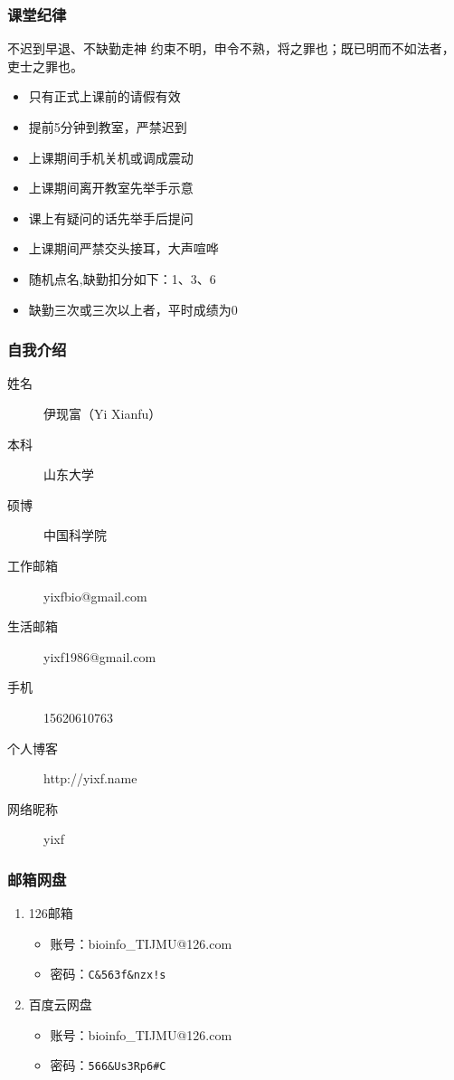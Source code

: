 \begin{frame}
  \frametitle{课堂纪律}
  \begin{alertblock}{不迟到早退、不缺勤走神}
  约束不明，申令不熟，将之罪也；既已明而不如法者，吏士之罪也。
  \end{alertblock}
  \pause
  \begin{itemize}[<+-|alert@+>]
    \item 只有正式上课前的请假有效
    \item 提前5分钟到教室，严禁迟到
    \item 上课期间手机关机或调成震动
    \item 上课期间离开教室先举手示意
    \item 课上有疑问的话先举手后提问
    \item 上课期间严禁交头接耳，大声喧哗
    \item 随机点名,缺勤扣分如下：1、3、6
    \item 缺勤三次或三次以上者，平时成绩为0
  \end{itemize}
\end{frame}

\begin{frame}
  \frametitle{自我介绍}
    \begin{description}
      \item[姓\qquad 名]伊现富（Yi Xianfu）
      \item[本\qquad 科]山东大学
      \item[硕\qquad 博]中国科学院
      \item[工作邮箱]yixfbio@gmail.com
      \item[生活邮箱]yixf1986@gmail.com
      \item[手\qquad 机]15620610763
      \item[个人博客]http://yixf.name
      \item[网络昵称]yixf
    \end{description}
\end{frame}

\begin{frame}
  \frametitle{邮箱网盘}
    \begin{enumerate}
      \item 126邮箱
        \begin{itemize}
          \item 账号：bioinfo\_TIJMU@126.com
          \item 密码：\texttt{C\&563f\&nzx!s}
        \end{itemize}
      \item \alert{百度云网盘}
        \begin{itemize}
	  \item \alert{账号：bioinfo\_TIJMU@126.com}
	  \item \alert{密码：\texttt{566\&Us3Rp6\#C}}
        \end{itemize}
    \end{enumerate}
\end{frame}

